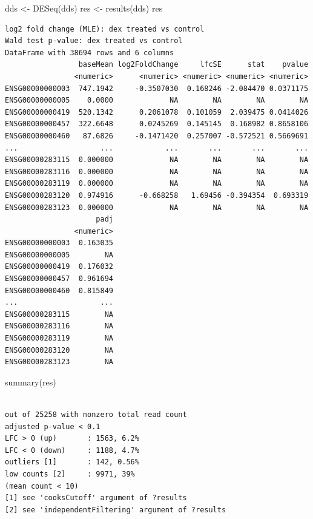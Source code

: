\documentclass[
  letterpaper,
  DIV=11,
  numbers=noendperiod]{scrartcl}
\newenvironment{Shaded}{\begin{snugshade}}{\end{snugshade}}
\newcommand{\FunctionTok}[1]{\textcolor[rgb]{0.28,0.35,0.67}{#1}}
\newcommand{\NormalTok}[1]{\textcolor[rgb]{0.00,0.23,0.31}{#1}}
\newcommand{\OtherTok}[1]{\textcolor[rgb]{0.00,0.23,0.31}{#1}}
\begin{document}
\begin{Shaded}
\begin{Highlighting}[]
\NormalTok{dds }\OtherTok{\textless{}{-}} \FunctionTok{DESeq}\NormalTok{(dds)}
\NormalTok{res }\OtherTok{\textless{}{-}} \FunctionTok{results}\NormalTok{(dds)}
\NormalTok{res}
\end{Highlighting}
\end{Shaded}

\begin{verbatim}
log2 fold change (MLE): dex treated vs control 
Wald test p-value: dex treated vs control 
DataFrame with 38694 rows and 6 columns
                 baseMean log2FoldChange     lfcSE      stat    pvalue
                <numeric>      <numeric> <numeric> <numeric> <numeric>
ENSG00000000003  747.1942     -0.3507030  0.168246 -2.084470 0.0371175
ENSG00000000005    0.0000             NA        NA        NA        NA
ENSG00000000419  520.1342      0.2061078  0.101059  2.039475 0.0414026
ENSG00000000457  322.6648      0.0245269  0.145145  0.168982 0.8658106
ENSG00000000460   87.6826     -0.1471420  0.257007 -0.572521 0.5669691
...                   ...            ...       ...       ...       ...
ENSG00000283115  0.000000             NA        NA        NA        NA
ENSG00000283116  0.000000             NA        NA        NA        NA
ENSG00000283119  0.000000             NA        NA        NA        NA
ENSG00000283120  0.974916      -0.668258   1.69456 -0.394354  0.693319
ENSG00000283123  0.000000             NA        NA        NA        NA
                     padj
                <numeric>
ENSG00000000003  0.163035
ENSG00000000005        NA
ENSG00000000419  0.176032
ENSG00000000457  0.961694
ENSG00000000460  0.815849
...                   ...
ENSG00000283115        NA
ENSG00000283116        NA
ENSG00000283119        NA
ENSG00000283120        NA
ENSG00000283123        NA
\end{verbatim}

\begin{Shaded}
\begin{Highlighting}[]
\FunctionTok{summary}\NormalTok{(res)}
\end{Highlighting}
\end{Shaded}

\begin{verbatim}

out of 25258 with nonzero total read count
adjusted p-value < 0.1
LFC > 0 (up)       : 1563, 6.2%
LFC < 0 (down)     : 1188, 4.7%
outliers [1]       : 142, 0.56%
low counts [2]     : 9971, 39%
(mean count < 10)
[1] see 'cooksCutoff' argument of ?results
[2] see 'independentFiltering' argument of ?results
\end{verbatim}
\end{document}
